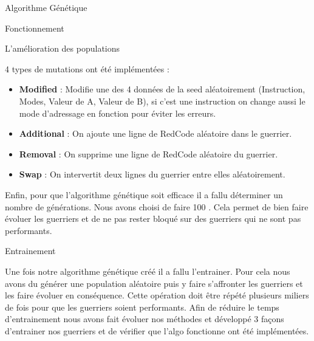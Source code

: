 \documentclass[a4paper, 10pt]{article}
\begin{document}
\begin{section}{Algorithme Génétique}
\begin{subsection}{Fonctionnement}
\begin{subsubsection}{L'amélioration des populations}
                    \medskip
                \par
                    4 types de mutations ont été implémentées : 
                    \begin{itemize}
                        \item \textbf{Modified} : Modifie une des 4 données de la seed aléatoirement (Instruction, Modes, Valeur de A, Valeur de B), si c'est une instruction on change aussi le mode d'adressage en fonction pour éviter les erreurs.
                        \item \textbf{Additional} : On ajoute une ligne de RedCode aléatoire dans le guerrier.
                        \item \textbf{Removal} : On supprime une ligne de RedCode aléatoire du guerrier.
                        \item \textbf{Swap} : On intervertit deux lignes du guerrier entre elles aléatoirement.
                    \end{itemize}
                    \bigskip
                \par
                    Enfin, pour que l'algorithme génétique soit efficace il a fallu déterminer un nombre de générations. Nous avons choisi de faire 100 . Cela permet de bien faire évoluer les guerriers et de ne pas rester bloqué sur des guerriers qui ne sont pas performants.
                    \bigskip

            \end{subsubsection}
        \end{subsection}

        \begin{subsection}{Entrainement}\label{sec:entrainement}
            \par
                Une fois notre algorithme génétique créé il a fallu l'entrainer. Pour cela nous avons du générer une population aléatoire puis y faire s'affronter les guerriers et les faire évoluer en conséquence. Cette opération doit être répété plusieurs miliers de fois pour que les guerriers soient performants. Afin de réduire le temps d'entrainement nous avons fait évoluer nos méthodes et développé 3 façons d'entrainer nos guerriers et de vérifier que l'algo fonctionne ont été implémentées.


\end{subsection}
\end{section}
\end{document}
